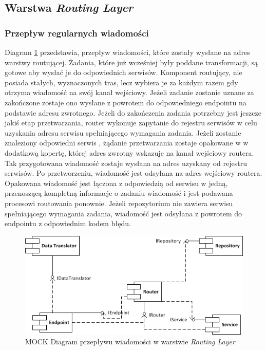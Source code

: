 \subsection{Warstwa \textit{Routing Layer}}

\subsubsection{Przepływ regularnych wiadomości}
Diagram \ref{fig:routing_layer_project} przedstawia, przepływ wiadomości, które zostały wysłane na adres warstwy routującej. Żadania, które już wcześniej były poddane transformacji, są gotowe aby wysłać je do odpowiednich serwisów. Komponent routujący, nie posiada stałych, wyznaczonych tras, lecz wybiera je za każdym razem gdy otrzyma wiadomość na swój kanał wejściowy. Jeżeli zadanie zostanie uznane za zakończone zostaje ono wysłane z powrotem do odpowiedniego endpointu na podstawie adresu zwrotnego. Jeżeli do zakończenia zadania potrzebny jest jeszcze jakiś etap przetwarzania, router wykonuje zapytanie do rejestru serwisów w celu uzyskania adresu serwisu spełniającego wymagania zadania. Jeżeli zostanie znaleziony odpowiedni serwis , żądanie przetwarzania zostaje opakowane w w dodatkową kopertę, której adres zwrotny wskazuje na kanał wejściowy routera. Tak przygotowana wiadomość zostaje wysłana na adres uzyskany od rejestru serwisów. Po przetworzeniu, wiadomość jest odsyłana na adres wejściowy routera. Opakowana wiadomość jest łączona z odpowiedzią od serwisu w jedną, przenoszącą kompletną informacje o zadaniu wiadomość i jest podawana procesowi routowania ponownie. Jeżeli repozytorium nie zawiera serwisu spełniającego wymagania zadania, wiadomość jest odsyłana z powrotem do endpointu z odpowiednim kodem błędu. 

\begin{figure}[!h]
	\centering
	\includegraphics[scale=1.0]{component_uml.png}
	\caption{MOCK Diagram przepływu wiadomości w warstwie \textit{Routing Layer}}\label{fig:routing_layer_project}
\end{figure}

